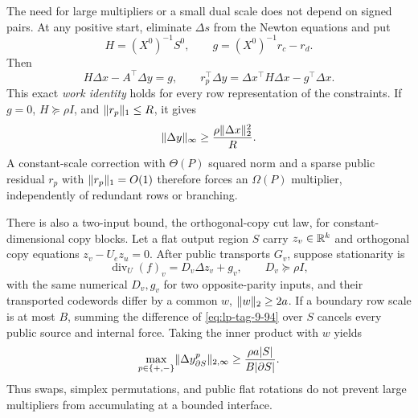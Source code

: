 The need for large multipliers or a small dual scale does not depend on
signed pairs.  At any positive start,
eliminate \(\Delta s\) from the Newton equations and put
\[
 H=(X^0)^{-1}S^0,\qquad g=(X^0)^{-1}r_c-r_d.
\]
Then
\begin{equation}
 H\Delta x-A^\top\Delta y=g,\qquad
 \boxed{r_p^\top\Delta y=\Delta x^\top H\Delta x-g^\top\Delta x}.
\end{equation}
This exact \emph{work identity} holds for every row representation of the
constraints.  If \(g=0\),
\(H\succeq\rho I\), and \(\lVert r_p\rVert_1\leq R\), it gives
\begin{equation}
 \lVert\Delta y\rVert_\infty\geq
 \frac{\rho\lVert\Delta x\rVert_2^2}{R}.
\end{equation}
A constant-scale correction with \(\Theta(P)\) squared norm and a sparse
public residual \(r_p\) with \(\lVert r_p\rVert_1=O(1)\) therefore forces an
\(\Omega(P)\) multiplier, independently of redundant rows or branching.

There is also a two-input bound, the orthogonal-copy cut law, for
constant-dimensional copy blocks.  Let a
flat output region \(S\) carry \(z_v\in\mathbb{R}^k\) and orthogonal copy equations
\(z_v-U_ez_u=0\).  After public transports \(G_v\), suppose stationarity is
\begin{equation}
 \operatorname{div}_U(f)_v=D_v\Delta z_v+g_v,
 \qquad D_v\succeq\rho I,
\label{eq:lp-tag-9-94}
\end{equation}
with the same numerical \(D_v,g_v\) for two opposite-parity inputs, and their
transported codewords differ by a common \(w\), \(\lVert w\rVert_2\geq2a\).  If a
boundary row scale is at most \(B\), summing the difference of
\eqref{eq:lp-tag-9-94} over
\(S\) cancels every public source and internal force.  Taking the inner
product with \(w\) yields
\begin{equation}
 \max_{p\in\{+,-\}}\lVert\Delta y_{\partial S}^p\rVert_{2,\infty}
 \geq\frac{\rho a|S|}{B|\partial S|}.
\end{equation}
Thus swaps, simplex permutations, and public flat rotations do not prevent
large multipliers from accumulating at a bounded interface.

